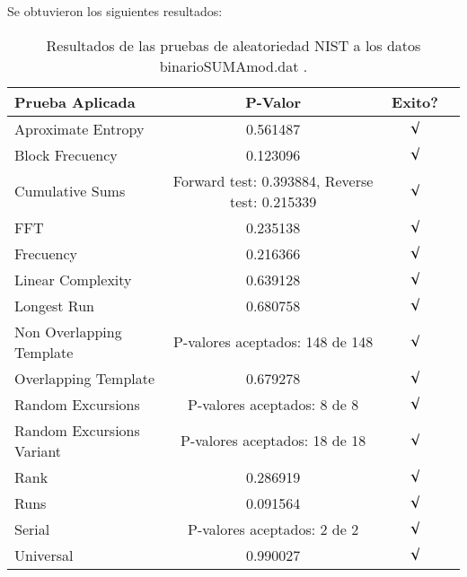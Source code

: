 \documentclass[12pt,3p]{elsarticle}
\begin{document}
Se obtuvieron los siguientes resultados:

\begin{table}[H]
\caption{Resultados de las pruebas de aleatoriedad NIST a los datos binarioSUMAmod.dat .}
\label{sample-table}
\vskip 0.15in
\begin{center}
\begin{small}
\begin{sc}
\begin{tabular}{lccr}
\hline

Prueba Aplicada &  P-Valor & Exito? \\
\hline

Aproximate Entropy    &   0.561487  & $\surd$ \\

Block Frecuency  &  0.123096 &  $\surd$  \\

Cumulative Sums    &   Forward test:  0.393884, Reverse test: 0.215339  & $\surd$ \\

FFT    &  0.235138 &   $\surd$      \\

Frecuency     &  0.216366 &  $\surd$   \\

Linear Complexity      & 0.639128  & $\surd$ \\

Longest Run      &   0.680758  &    $\surd$      \\

Non Overlapping Template      & P-valores aceptados: 148 de 148    &     $\surd$          \\

Overlapping Template      &  0.679278  &        $\surd$       \\

Random Excursions      & P-valores aceptados: 8 de 8  &     $\surd$          \\

Random Excursions Variant & P-valores aceptados: 18 de 18  &    $\surd$        \\

Rank &   0.286919   &       $\surd$      \\

Runs &      0.091564 &     $\surd$        \\

Serial &     P-valores aceptados: 2 de 2    &     $\surd$        \\

Universal &     0.990027 &   $\surd$            \\

\hline



\end{tabular}
\end{sc}
\end{small}
\end{center}
\vskip -0.1in
\end{table}
\end{document}
